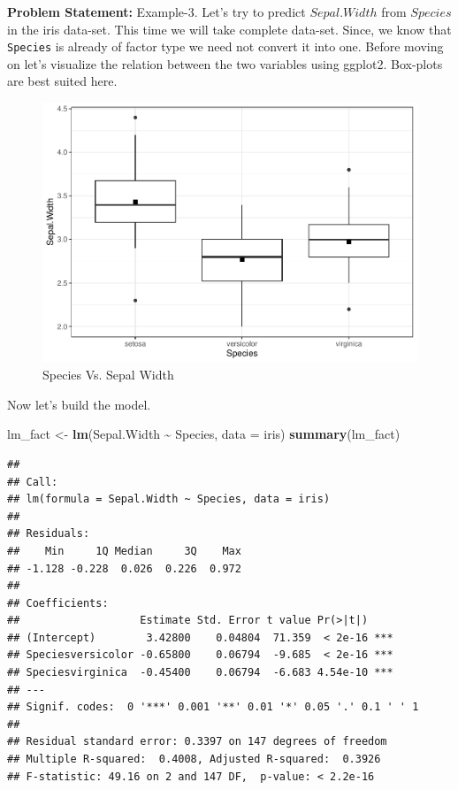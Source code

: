 \documentclass[
]{book}
\newenvironment{Shaded}{\begin{snugshade}}{\end{snugshade}}
\newcommand{\AttributeTok}[1]{\textcolor[rgb]{0.13,0.29,0.53}{#1}}
\newcommand{\FunctionTok}[1]{\textcolor[rgb]{0.13,0.29,0.53}{\textbf{#1}}}
\newcommand{\NormalTok}[1]{#1}
\newcommand{\OtherTok}[1]{\textcolor[rgb]{0.56,0.35,0.01}{#1}}
\newcommand{\SpecialCharTok}[1]{\textcolor[rgb]{0.81,0.36,0.00}{\textbf{#1}}}
\begin{document}
\textbf{Problem Statement:} Example-3. Let's try to predict \({Sepal.Width}\) from \({Species}\) in the iris data-set. This time we will take complete data-set. Since, we know that \texttt{Species} is already of factor type we need not convert it into one. Before moving on let's visualize the relation between the two variables using ggplot2. Box-plots are best suited here.

\begin{figure}

{\centering \includegraphics[height=0.3\textheight]{DauR_files/figure-latex/fact1-1} 

}

\caption{Species Vs. Sepal Width}\label{fig:fact1}
\end{figure}

Now let's build the model.

\begin{Shaded}
\begin{Highlighting}[]
\NormalTok{lm\_fact }\OtherTok{\textless{}{-}} \FunctionTok{lm}\NormalTok{(Sepal.Width }\SpecialCharTok{\textasciitilde{}}\NormalTok{ Species, }\AttributeTok{data =}\NormalTok{ iris)}
\FunctionTok{summary}\NormalTok{(lm\_fact)}
\end{Highlighting}
\end{Shaded}

\begin{verbatim}
## 
## Call:
## lm(formula = Sepal.Width ~ Species, data = iris)
## 
## Residuals:
##    Min     1Q Median     3Q    Max 
## -1.128 -0.228  0.026  0.226  0.972 
## 
## Coefficients:
##                   Estimate Std. Error t value Pr(>|t|)    
## (Intercept)        3.42800    0.04804  71.359  < 2e-16 ***
## Speciesversicolor -0.65800    0.06794  -9.685  < 2e-16 ***
## Speciesvirginica  -0.45400    0.06794  -6.683 4.54e-10 ***
## ---
## Signif. codes:  0 '***' 0.001 '**' 0.01 '*' 0.05 '.' 0.1 ' ' 1
## 
## Residual standard error: 0.3397 on 147 degrees of freedom
## Multiple R-squared:  0.4008, Adjusted R-squared:  0.3926 
## F-statistic: 49.16 on 2 and 147 DF,  p-value: < 2.2e-16
\end{verbatim}
\end{document}
